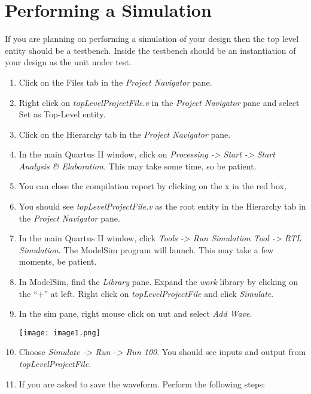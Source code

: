 \chapter{Performing a Simulation}
\graphicspath{ {./Lab00HowTo/howTo20 Performing Simulation/Fig} }

If you are planning on performing a simulation of your design then the
top level entity should be a testbench. Inside the testbench should be
an instantiation of your design as the unit under test.

\begin{enumerate}
\def\labelenumi{\arabic{enumi}.}
\item
  Click on the Files tab in the \emph{Project Navigator} pane.
\item
  Right click on \emph{topLevelProjectFile.v} in the \emph{Project
  Navigator} pane and select Set as Top-Level entity.
\item
  Click on the Hierarchy tab in the \emph{Project Navigator} pane.
\item
  In the main Quartus II window, click on \emph{Processing
  -\textgreater{} Start -\textgreater{} Start Analysis \& Elaboration.}
  This may take some time, so be patient.
\item
  You can close the compilation report by clicking on the x in the red
  box,
\item
  You should see \emph{topLevelProjectFile.v} as the root entity in the
  Hierarchy tab in the \emph{Project Navigator} pane.
\item
  In the main Quartus II window, click \emph{Tools -\textgreater{} Run
  Simulation Tool -\textgreater{} RTL Simulation}. The ModelSim program
  will launch. This may take a few moments, be patient.
\item
  In ModelSim, find the \emph{Library} pane. Expand the \emph{work}
  library by clicking on the ``+'' at left. Right click on
  \emph{topLevelProjectFile} and click \emph{Simulate}.
\item
  In the sim pane, right mouse click on uut and select \emph{Add Wave}.

\texttt{[image: image1.png]}

\item
  Choose \emph{Simulate -\textgreater{} Run -\textgreater{} Run 100}.
  You should see inputs and output from \emph{topLevelProjectFile}.
\item
  If you are asked to save the waveform. Perform the following steps:


\end{enumerate}
